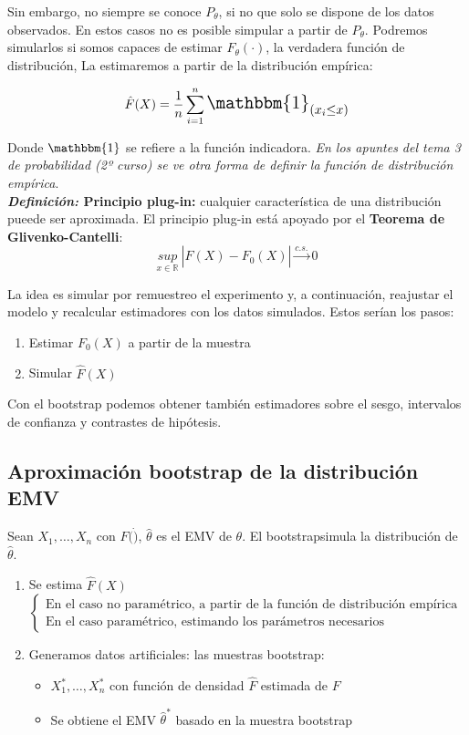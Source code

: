 Sin embargo, no siempre se conoce $P_\theta$, si no que solo se dispone de los datos observados. En estos casos no es posible simpular a partir de $P_\theta$.
Podremos simularlos si somos capaces de estimar $F_\theta(\cdot)$, la verdadera función de distribución, La estimaremos a partir de la distribución empírica:

$$\hat{F}(X)=\frac{1}{n}\sum_{i=1}^{n}\text{\Large{$\mathbbm{1}_{(x_i\leq x)}$}}$$

Donde $\mathbbm{1}$ se refiere a la función indicadora. \textit{En los apuntes del tema 3 de probabilidad (2º curso) se ve otra forma de definir la función de distribución empírica}.\\

\textbf{\textit{Definición:} Principio plug-in:} cualquier característica de una distribución pueede ser aproximada. El principio plug-in está apoyado por el \textbf{Teorema de Glivenko-Cantelli}:
$$\underset{x\in\mathbb{R}}{sup}\ |\hat F(X)-F_0(X)|\overset{c.s.}{\longrightarrow}0$$

La idea es simular por remuestreo el experimento y, a continuación, reajustar el modelo y recalcular estimadores con los datos simulados. Estos serían los pasos:
\begin{enumerate}
    \item Estimar $F_0(X)$ a partir de la muestra
    \item Simular $\hat F(X)$
\end{enumerate}
Con el bootstrap podemos obtener también estimadores sobre el sesgo, intervalos de confianza y contrastes de hipótesis.

\subsection{Aproximación bootstrap de la distribución EMV}

Sean $X_1,\dots,X_n$ con $F(\dot)$, $\hat\theta$ es el EMV de $\theta$. El bootstrapsimula la distribución de $\hat\theta$.
\begin{enumerate}
    \item Se estima $\hat F(X)$$\begin{cases}
              \text{En el caso no paramétrico, a partir de la función de distribución empírica} \\
              \text{En el caso paramétrico, estimando los parámetros necesarios}
          \end{cases}$
    \item Generamos datos artificiales: las muestras bootstrap:
          \begin{itemize}
              \item $X_1^*,\dots,X_n^*$ con función de densidad $\hat F$ estimada de $F$
              \item Se obtiene el EMV $\hat\theta^*$ basado en la muestra bootstrap
          \end{itemize}
\end{enumerate}

